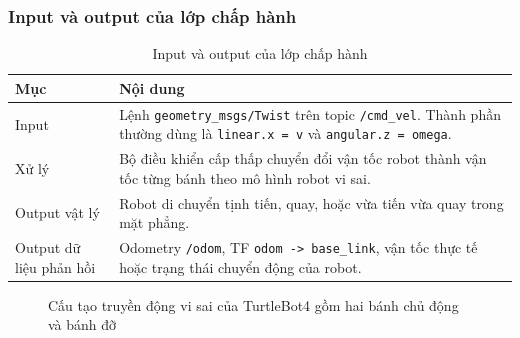 \subsubsection{Input và output của lớp chấp hành}
\label{subsubsec:actuator-io}

\begin{table}[H]
    \centering
    \caption{Input và output của lớp chấp hành}
    \label{tab:actuator-io}
    \renewcommand{\arraystretch}{1.25}
    \small
    \begin{tabularx}{\textwidth}{|>{\raggedright\arraybackslash}p{}|>{\raggedright\arraybackslash}X|}
        \hline
        \textbf{Mục} & \textbf{Nội dung} \\
        \hline
        Input & Lệnh \texttt{geometry\_msgs/Twist} trên topic \texttt{/cmd\_vel}. Thành phần thường dùng là \texttt{linear.x = v} và \texttt{angular.z = omega}. \\
        \hline
        Xử lý & Bộ điều khiển cấp thấp chuyển đổi vận tốc robot thành vận tốc từng bánh theo mô hình robot vi sai. \\
        \hline
        Output vật lý & Robot di chuyển tịnh tiến, quay, hoặc vừa tiến vừa quay trong mặt phẳng. \\
        \hline
        Output dữ liệu phản hồi & Odometry \texttt{/odom}, TF \texttt{odom -> base\_link}, vận tốc thực tế hoặc trạng thái chuyển động của robot. \\
        \hline
    \end{tabularx}
\end{table}

\begin{figure}[H]
\centering
{}
\caption{Cấu tạo truyền động vi sai của TurtleBot4 gồm hai bánh chủ động và bánh đỡ}
\label{fig:turtlebot4-differential-drive}
\end{figure}

